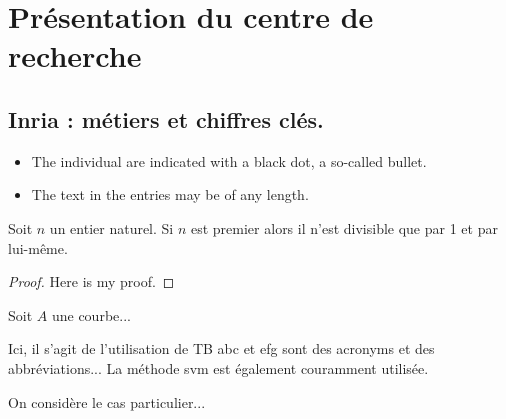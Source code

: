 \section{Présentation du centre de recherche}
\label{chap:sectionone}

\subsection{Inria : métiers et chiffres clés.}

  

\begin{itemize}
	\item The individual  are indicated with a black dot, a so-called bullet.
	\item The text in the entries may be of any length.
\end{itemize}

\begin{theorem}\label{theo1}
Soit $n$ un entier naturel. Si $n$ est premier alors il n'est divisible que par 1 et par lui-même.
\end{theorem}

\begin{proof}
Here is my proof.
\end{proof}

\begin{definition}\label{def1}
Soit $A$ une courbe...
\end{definition}

Ici, il s'agit de l'utilisation de TB %
\gls{abc} et \gls{efg} sont des acronyms et des abbréviations... La méthode \gls{svm} est également couramment utilisée.

\begin{exemple}\label{exo1}
On considère le cas particulier... 
\end{exemple}